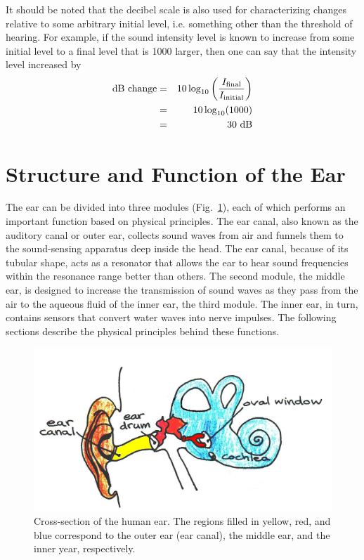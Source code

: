 It should be noted that the decibel scale is also used for characterizing changes relative to some arbitrary initial level, i.e. something other than the threshold of hearing. For example, if the sound intensity level is known to increase from some initial level to a final level that is 1000 larger, then one can say that the intensity level increased by 
\begin{eqnarray}\label{eqn3-6}
{\rm dB~change} &=& 10 \log_{10}\left(\frac{I_{\rm final}}{I_{\rm initial}}\right)\\
&=& 10 \log_{10}(1000)\nonumber\\
&=& 30~{\rm dB}\nonumber
\end{eqnarray}

\section{Structure and Function of the Ear}
 
The ear can be divided into three modules (Fig.~\ref{Fig3-2}), each of which performs an important function based on physical principles.  The ear canal, also known as the auditory canal or outer ear, collects sound waves from air and funnels them to the sound-sensing apparatus deep inside the head.  The ear canal, because of its tubular shape, acts as a resonator that allows the ear to hear sound frequencies within the resonance range better than others.  The second module, the middle ear, is designed to increase the transmission of sound waves as they pass from the air to the aqueous fluid of the inner ear, the third module.  The inner ear, in turn, contains sensors that convert water waves into nerve impulses.  The following sections describe the physical principles behind these functions. 
\begin{figure}[h]
	\centering
	\includegraphics[width=\textwidth]{./figures/Topic3/Fig3-2.jpg}
	\caption{Cross-section of the human ear. The regions filled in yellow, red, and blue correspond to the outer ear (ear canal), the middle ear, and the inner year, respectively.}
 	\label{Fig3-2}
\end{figure}

